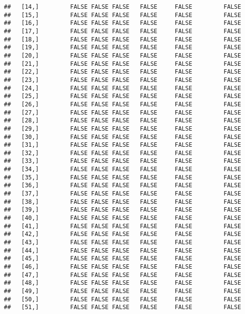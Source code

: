 \documentclass[
]{article}
\begin{document}
\begin{verbatim}
##   [14,]         FALSE FALSE FALSE   FALSE     FALSE         FALSE
##   [15,]         FALSE FALSE FALSE   FALSE     FALSE         FALSE
##   [16,]         FALSE FALSE FALSE   FALSE     FALSE         FALSE
##   [17,]         FALSE FALSE FALSE   FALSE     FALSE         FALSE
##   [18,]         FALSE FALSE FALSE   FALSE     FALSE         FALSE
##   [19,]         FALSE FALSE FALSE   FALSE     FALSE         FALSE
##   [20,]         FALSE FALSE FALSE   FALSE     FALSE         FALSE
##   [21,]         FALSE FALSE FALSE   FALSE     FALSE         FALSE
##   [22,]         FALSE FALSE FALSE   FALSE     FALSE         FALSE
##   [23,]         FALSE FALSE FALSE   FALSE     FALSE         FALSE
##   [24,]         FALSE FALSE FALSE   FALSE     FALSE         FALSE
##   [25,]         FALSE FALSE FALSE   FALSE     FALSE         FALSE
##   [26,]         FALSE FALSE FALSE   FALSE     FALSE         FALSE
##   [27,]         FALSE FALSE FALSE   FALSE     FALSE         FALSE
##   [28,]         FALSE FALSE FALSE   FALSE     FALSE         FALSE
##   [29,]         FALSE FALSE FALSE   FALSE     FALSE         FALSE
##   [30,]         FALSE FALSE FALSE   FALSE     FALSE         FALSE
##   [31,]         FALSE FALSE FALSE   FALSE     FALSE         FALSE
##   [32,]         FALSE FALSE FALSE   FALSE     FALSE         FALSE
##   [33,]         FALSE FALSE FALSE   FALSE     FALSE         FALSE
##   [34,]         FALSE FALSE FALSE   FALSE     FALSE         FALSE
##   [35,]         FALSE FALSE FALSE   FALSE     FALSE         FALSE
##   [36,]         FALSE FALSE FALSE   FALSE     FALSE         FALSE
##   [37,]         FALSE FALSE FALSE   FALSE     FALSE         FALSE
##   [38,]         FALSE FALSE FALSE   FALSE     FALSE         FALSE
##   [39,]         FALSE FALSE FALSE   FALSE     FALSE         FALSE
##   [40,]         FALSE FALSE FALSE   FALSE     FALSE         FALSE
##   [41,]         FALSE FALSE FALSE   FALSE     FALSE         FALSE
##   [42,]         FALSE FALSE FALSE   FALSE     FALSE         FALSE
##   [43,]         FALSE FALSE FALSE   FALSE     FALSE         FALSE
##   [44,]         FALSE FALSE FALSE   FALSE     FALSE         FALSE
##   [45,]         FALSE FALSE FALSE   FALSE     FALSE         FALSE
##   [46,]         FALSE FALSE FALSE   FALSE     FALSE         FALSE
##   [47,]         FALSE FALSE FALSE   FALSE     FALSE         FALSE
##   [48,]         FALSE FALSE FALSE   FALSE     FALSE         FALSE
##   [49,]         FALSE FALSE FALSE   FALSE     FALSE         FALSE
##   [50,]         FALSE FALSE FALSE   FALSE     FALSE         FALSE
##   [51,]         FALSE FALSE FALSE   FALSE     FALSE         FALSE

\end{verbatim}
\end{document}
